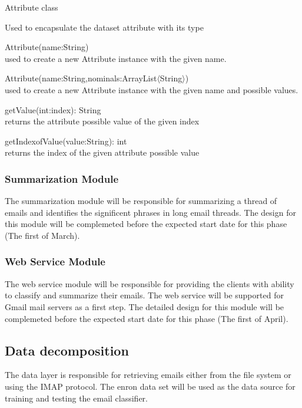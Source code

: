 \begin{my_itemize}
  \item Attribute class
  \begin{my_desc}
    \item[Purpose] Used to encapsulate the dataset attribute with its type
    \item[Functions] \hfill
    \begin{my_itemize}
      \item Attribute(name:String) \\
      used to create a new Attribute instance with the given name.
      \item Attribute(name:String,nominals:ArrayList$\langle$String$\rangle$) \\
      used to create a new Attribute instance with the given name and possible values.
      \item getValue(int:index): String \\
      returns the attribute possible value of the given index
      \item getIndexofValue(value:String): int \\
      returns the index of the given attribute possible value
    \end{my_itemize}

  \end{my_desc}

\end{my_itemize}

\subsubsection{Summarization Module}
The summarization module will be responsible for summarizing a thread of emails and identifies the significent phrases in long email threads. The design for this module will be complemeted before the expected start date for this phase (The first of March).

\subsubsection{Web Service Module}
The web service module will be responsible for providing the clients with ability to classify and summarize their emails. The web service will be supported for Gmail mail servers as a first step. The detailed design for this module will be complemeted before the expected start date for this phase (The first of April).

\subsection{Data decomposition}
The data layer is responsible for retrieving emails either from the file system or using the IMAP protocol. The enron data set will be used as the data source for training and testing the email classifier.

